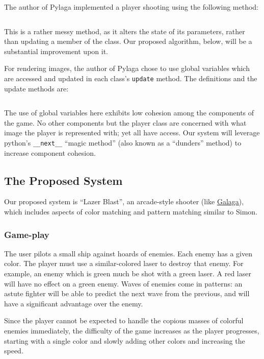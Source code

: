 The author of Pylaga implemented a player shooting using the following
method:

\inputminted[baselinestretch=1]{python}{../code/pylaga_player.py}

This is a rather messy method, as it alters the state of its parameters,
rather than updating a member of the class.  Our proposed algorithm,
below, will be a substantial improvement upon it.

For rendering images, the author of Pylaga chose to use global variables
which are accessed and updated in each class's \texttt{update}
method.  The definitions and the update methods are:

\inputminted[baselinestretch=1]{python}{../code/pylaga_images_and_update.py}

The use of global variables here exhibits low cohesion among the
components of the game.  No other components but the player class
are concerned with what image the player is represented with; yet
all have access.  Our system will leverage python's \texttt{__next__}
``magic method'' (also known as a ``dunders'' method) to increase component
cohesion.

\subsection*{The Proposed System}
Our proposed system is ``Lazer Blast'', an arcade-style shooter (like
\href{https://en.wikipedia.org/wiki/Galaga}{Galaga}), which includes
aspects of color matching and pattern matching similar to Simon.

\subsubsection*{Game-play}
The user pilots a small ship against hoards of enemies.  Each enemy
has a given color.  The player must use a similar-colored laser to
destroy that enemy.  For example, an enemy which is green much be
shot with a green laser.  A red laser will have no effect on a green enemy.
Waves of enemies come in patterns: an astute fighter will be able to
predict the next wave from the previous, and will have a significant
advantage over the enemy.

Since the player cannot be expected to handle the copious masses
of colorful enemies immediately, the difficulty of the game increases
as the player progresses, starting with a single color and slowly
adding other colors and increasing the speed.

